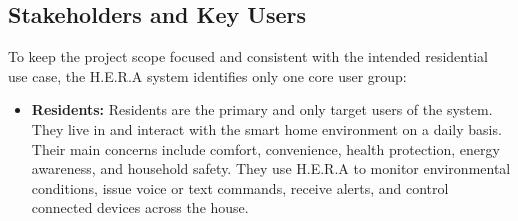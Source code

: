 


\subsection{Stakeholders and Key Users}
To keep the project scope focused and consistent with the intended residential use case, the H.E.R.A system identifies only one core user group:

\begin{itemize}
  \item \textbf{Residents:} Residents are the primary and only target users of the system. They live in and interact with the smart home environment on a daily basis. Their main concerns include comfort, convenience, health protection, energy awareness, and household safety. They use H.E.R.A to monitor environmental conditions, issue voice or text commands, receive alerts, and control connected devices across the house.
\end{itemize}

